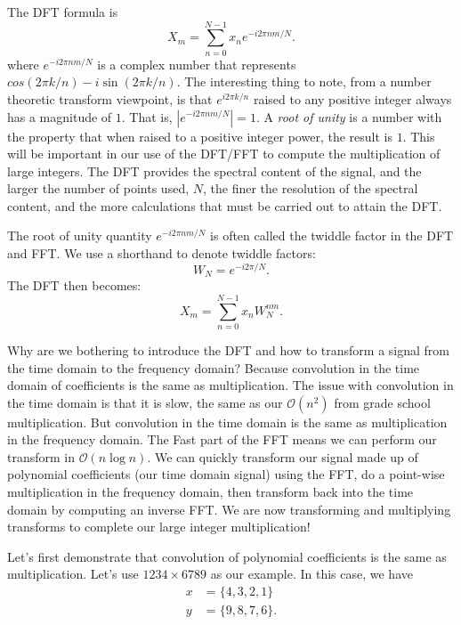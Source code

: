 \documentclass[psamsfonts,reqno]{amsart}
\theoremstyle{definition}
\theoremstyle{remark}
\numberwithin{equation}{section}
\begin{document}
The DFT formula is
\begin{equation*}
	X_m = \sum_{n=0}^{N-1}x_n e^{-i2\pi nm/N}.
\end{equation*}
where $e^{-i2\pi nm/N}$ is a complex number that represents $cos{(2 \pi k/n)} - i\sin{(2 \pi k/n)}$. The interesting thing to note, from a number theoretic transform viewpoint, is that $e^{i2\pi k/n}$ raised to any positive integer always has a magnitude of $1$. That is, $|e^{-i2\pi nm/N}| = 1$. A \textit{root of unity} is a number with the property that when raised to a positive integer power, the result is $1$. This will be important in our use of the DFT/FFT to compute the multiplication of large integers. The DFT provides the spectral content of the signal, and the larger the number of points used, $N$, the finer the resolution of the spectral content, and the more calculations that must be carried out to attain the DFT.

The root of unity quantity $e^{-i2\pi nm/N}$ is often called the twiddle factor in the DFT and FFT. We use a shorthand to denote twiddle factors:
\begin{equation}
	W_N = e^{-i 2 \pi /N}.
\end{equation}
The DFT then becomes:
\begin{equation*}
	X_m = \sum_{n=0}^{N-1}x_n W_N^{nm}.
\end{equation*}

Why are we bothering to introduce the DFT and how to transform a signal from the time domain to the frequency domain? Because convolution in the time domain of coefficients is the same as multiplication. The issue with convolution in the time domain is that it is slow, the same as our $\mathcal{O}(n^2)$ from grade school multiplication. But convolution in the time domain is the same as multiplication in the frequency domain. The Fast part of the FFT means we can perform our transform in $\mathcal{O}(n \log{n})$. We can quickly transform our signal made up of polynomial coefficients (our time domain signal) using the FFT, do a point-wise multiplication in the frequency domain, then transform back into the time domain by computing an inverse FFT. We are now transforming and multiplying transforms to complete our large integer multiplication! 

Let's first demonstrate that convolution of polynomial coefficients is the same as multiplication. Let's use $1234 \times 6789$ as our example. In this case, we have
\begin{align*}
	x &= \{4, 3, 2, 1\} \\
	y &= \{9, 8, 7, 6\}.
\end{align*}
\end{document}
